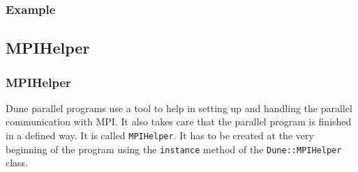 \begin{frame}
  \frametitle{Example}

\end{frame}

\subsection{MPIHelper}
\begin{frame}[fragile]
  \frametitle<presentation>{MPIHelper}
  Dune parallel programs use a tool to help in setting up and handling the
parallel communication with MPI. It also takes care that the parallel program
is finished in a defined way. It is called \lstinline!MPIHelper!. It has to be
created at the very beginning of the program
using the \lstinline!instance! method of the \lstinline!Dune::MPIHelper! class.


\end{frame}

